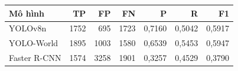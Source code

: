 \begin{tabular}{lrrrrrr}
\toprule
Mô hình & TP & FP & FN & P & R & F1 \\
\midrule
YOLOv8n & 1752 & 695 & 1723 & 0{,}7160 & 0{,}5042 & 0{,}5917 \\
YOLO-World & 1895 & 1003 & 1580 & 0{,}6539 & 0{,}5453 & 0{,}5947 \\
Faster R-CNN & 1574 & 3258 & 1901 & 0{,}3257 & 0{,}4529 & 0{,}3790 \\
\bottomrule
\end{tabular}
